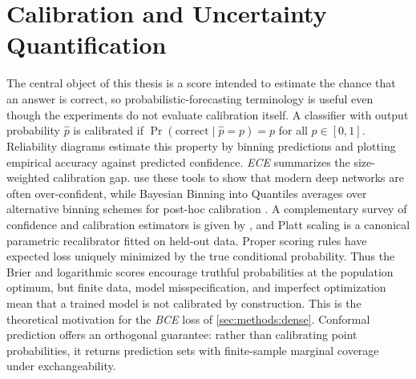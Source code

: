\documentclass[a4paper,oneside,10pt,english]{scrbook}
\DeclareRobustCommand{\acfit}[1]{\textit{\ac{#1}}}
\begin{document}
\section{Calibration and Uncertainty Quantification}
\label{sec:bg:calibration}

The central object of this thesis is a score intended to estimate the chance that an answer is correct, so probabilistic-forecasting terminology is useful even though the experiments do not evaluate calibration itself. A classifier with output probability $\hat p$ is calibrated if $\Pr(\text{correct} \mid \hat p = p) = p$ for all $p \in [0,1]$. Reliability diagrams estimate this property by binning predictions and plotting empirical accuracy against predicted confidence. \acfit{ECE} summarizes the size-weighted calibration gap. \citet{nncalibration} use these tools to show that modern deep networks are often over-confident, while Bayesian Binning into Quantiles averages over alternative binning schemes for post-hoc calibration \citep{bayesianbinning}. A complementary survey of confidence and calibration estimators is given by \citet{confestcalibsurvey}, and Platt scaling \citep{probabilisticoutputs} is a canonical parametric recalibrator fitted on held-out data. Proper scoring rules \citep{strictlyproper,forecastverification} have expected loss uniquely minimized by the true conditional probability. Thus the Brier and logarithmic scores encourage truthful probabilities at the population optimum, but finite data, model misspecification, and imperfect optimization mean that a trained model is not calibrated by construction. This is the theoretical motivation for the \acfit{BCE} loss of \autoref{sec:methods:dense}. Conformal prediction \citep{conformallm} offers an orthogonal guarantee: rather than calibrating point probabilities, it returns prediction sets with finite-sample marginal coverage under exchangeability.
\end{document}
